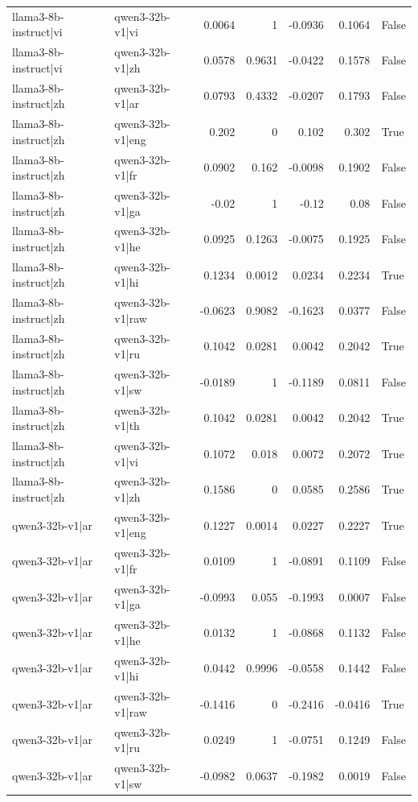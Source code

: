 \begin{table}
\begin{tabular}{l l r r r r l}
llama3-8b-instruct|vi & qwen3-32b-v1|vi & 0.0064 & 1 & -0.0936 & 0.1064 & False \\
llama3-8b-instruct|vi & qwen3-32b-v1|zh & 0.0578 & 0.9631 & -0.0422 & 0.1578 & False \\
llama3-8b-instruct|zh & qwen3-32b-v1|ar & 0.0793 & 0.4332 & -0.0207 & 0.1793 & False \\
llama3-8b-instruct|zh & qwen3-32b-v1|eng & 0.202 & 0 & 0.102 & 0.302 & True \\
llama3-8b-instruct|zh & qwen3-32b-v1|fr & 0.0902 & 0.162 & -0.0098 & 0.1902 & False \\
llama3-8b-instruct|zh & qwen3-32b-v1|ga & -0.02 & 1 & -0.12 & 0.08 & False \\
llama3-8b-instruct|zh & qwen3-32b-v1|he & 0.0925 & 0.1263 & -0.0075 & 0.1925 & False \\
llama3-8b-instruct|zh & qwen3-32b-v1|hi & 0.1234 & 0.0012 & 0.0234 & 0.2234 & True \\
llama3-8b-instruct|zh & qwen3-32b-v1|raw & -0.0623 & 0.9082 & -0.1623 & 0.0377 & False \\
llama3-8b-instruct|zh & qwen3-32b-v1|ru & 0.1042 & 0.0281 & 0.0042 & 0.2042 & True \\
llama3-8b-instruct|zh & qwen3-32b-v1|sw & -0.0189 & 1 & -0.1189 & 0.0811 & False \\
llama3-8b-instruct|zh & qwen3-32b-v1|th & 0.1042 & 0.0281 & 0.0042 & 0.2042 & True \\
llama3-8b-instruct|zh & qwen3-32b-v1|vi & 0.1072 & 0.018 & 0.0072 & 0.2072 & True \\
llama3-8b-instruct|zh & qwen3-32b-v1|zh & 0.1586 & 0 & 0.0585 & 0.2586 & True \\
qwen3-32b-v1|ar & qwen3-32b-v1|eng & 0.1227 & 0.0014 & 0.0227 & 0.2227 & True \\
qwen3-32b-v1|ar & qwen3-32b-v1|fr & 0.0109 & 1 & -0.0891 & 0.1109 & False \\
qwen3-32b-v1|ar & qwen3-32b-v1|ga & -0.0993 & 0.055 & -0.1993 & 0.0007 & False \\
qwen3-32b-v1|ar & qwen3-32b-v1|he & 0.0132 & 1 & -0.0868 & 0.1132 & False \\
qwen3-32b-v1|ar & qwen3-32b-v1|hi & 0.0442 & 0.9996 & -0.0558 & 0.1442 & False \\
qwen3-32b-v1|ar & qwen3-32b-v1|raw & -0.1416 & 0 & -0.2416 & -0.0416 & True \\
qwen3-32b-v1|ar & qwen3-32b-v1|ru & 0.0249 & 1 & -0.0751 & 0.1249 & False \\
qwen3-32b-v1|ar & qwen3-32b-v1|sw & -0.0982 & 0.0637 & -0.1982 & 0.0019 & False \\

\end{tabular}
\end{table}
